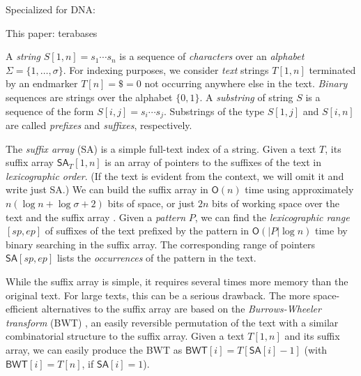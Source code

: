 \documentclass[smallabstract,smallcaptions]{dccpaper}
\newcommand{\set}[1]{\ensuremath{\{ #1 \}}}
\newcommand{\abs}[1]{\ensuremath{\lvert #1 \rvert}}
\newcommand{\Oh}{\ensuremath{\mathsf{O}}}
\newcommand{\SA}{\textsf{SA}}
\newcommand{\BWT}{\textsf{BWT}}
\newcommand{\mSA}{\ensuremath{\mathsf{SA}}}
\newcommand{\mBWT}{\ensuremath{\mathsf{BWT}}}
\begin{document}
Specialized for DNA: \cite{Bauer2013,Liu2014,Li2014a,Pantaleoni2014,Wang2015}

This paper: terabases



A \emph{string} $S[1,n] = s_{1} \dotsm s_{n}$ is a sequence of \emph{characters} over an \emph{alphabet} $\Sigma = \set{1, \dotsc, \sigma}$. For indexing purposes, we consider \emph{text} strings $T[1,n]$ terminated by an endmarker $T[n] = \$ = 0$ not occurring anywhere else in the text. \emph{Binary} sequences are strings over the alphabet $\set{0, 1}$. A \emph{substring} of string $S$ is a sequence of the form $S[i,j] = s_{i} \dotsm s_{j}$. Substrings of the type $S[1,j]$ and $S[i,n]$ are called \emph{prefixes} and \emph{suffixes}, respectively.

The \emph{suffix array} (\SA) \cite{Manber1993} is a simple full-text index of a string. Given a text $T$, its suffix array $\mSA_{T}[1,n]$ is an array of pointers to the suffixes of the text in \emph{lexicographic order}. (If the text is evident from the context, we will omit it and write just \SA.) We can build the suffix array in $\Oh(n)$ time using approximately $n(\log n + \log \sigma + 2)$ bits of space, or just $2n$ bits of working space over the text and the suffix array \cite{Nong2011}. Given a \emph{pattern} $P$, we can find the \emph{lexicographic range} $[sp,ep]$ of suffixes of the text prefixed by the pattern in $\Oh(\abs{P} \log n)$ time by binary searching in the suffix array. The corresponding range of pointers $\mSA[sp,ep]$ lists the \emph{occurrences} of the pattern in the text.

While the suffix array is simple, it requires several times more memory than the original text. For large texts, this can be a serious drawback. The more space-efficient alternatives to the suffix array are based on the \emph{Burrows-Wheeler transform} (\BWT) \cite{Burrows1994}, an easily reversible permutation of the text with a similar combinatorial structure to the suffix array. Given a text $T[1,n]$ and its suffix array, we can easily produce the \BWT{} as $\mBWT[i] = T[\mSA[i]-1]$ (with $\mBWT[i] = T[n]$, if $\mSA[i] = 1$).
\end{document}
